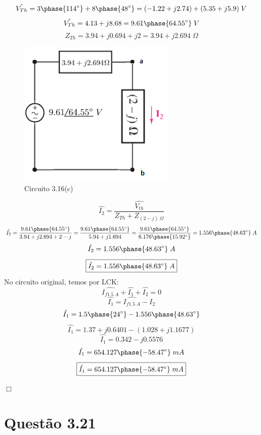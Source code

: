 \documentclass[
	12pt,				%
	oneside,			%
	a4paper,			%
	english,			%
	french,				%
	spanish,			%
	brazil				%
	]{abntex2}
\begin{document}
$$\hat{V_{Th}} = {3 \phase{114^{\circ}}}+{8 \phase{48^{\circ}}}={(-1.22+j2.74)+(5.35+j5.9)}\;V$$
$$\hat{V_{Th}} ={4.13+j8.68}={9.61 \phase{64.55^{\circ}}}\;V$$
$$Z_{Th} ={3.94+j0.694+j2}={3.94+j2.694}\;\Omega$$
\newpage
\begin{figure}[htb]
	\centering
	\includegraphics[scale=0.6]{3-16(c).PNG}
	\caption{Circuito 3.16(c)}
\end{figure}

$$\hat{I_2}={\dfrac{\hat{V_{th}}}{Z_{Th}+Z_{(2-j)\;\Omega}}}$$
$$\hat{I_2}={\dfrac{9.61 \phase{64.55^{\circ}}}{3.94+j2.694+2-j}}={\dfrac{9.61 \phase{64.55^{\circ}}}{5.94+j1.694}}={\dfrac{9.61 \phase{64.55^{\circ}}}{6.176 \phase{15.92^{\circ}}}}={1.556 \phase{48.63^{\circ}}}\;A$$
$$\hat{I_2}={1.556 \phase{48.63^{\circ}}}\;A$$
\begin{equation}
    \fbox{$\hat{I_2}={1.556 \phase{48.63^{\circ}}}\;A$}
\end{equation}
No circuito original, temos por LCK:
$$\hat{I_{f1.5\;A}}+\hat{I_1}+\hat{I_2}=0$$
$$\hat{I_1}=\hat{I_{f1.5\;A}}-\hat{I_2}$$
$$\hat{I_1}={1.5 \phase{24^{\circ}}}-{1.556 \phase{48.63^{\circ}}}$$
$$\hat{I_1}=1.37+j0.6401-(1.028+j1.1677)$$
$$\hat{I_1}=0.342-j0.5576$$
$$\hat{I_1}={654.127 \phase{-58.47^{\circ}}}\;mA$$
\begin{equation}
    \fbox{$\hat{I_1}={654.127 \phase{-58.47^{\circ}}}\;mA$}
\end{equation}

\begin{flushright}
    $\Box$
\end{flushright}

\newpage

\section*{Questão 3.21} 
\end{document}

